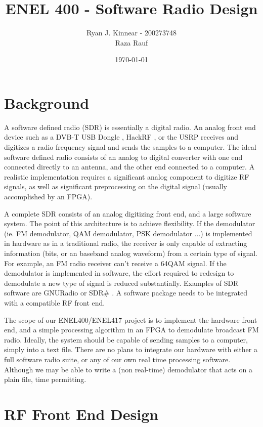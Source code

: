 \documentclass[a4paper, 12pt]{article}
\author{Ryan J. Kinnear - 200273748 \\ Raza Rauf}
\title{ENEL 400 - Software Radio Design}
\date{\today}
\begin{document}
\maketitle

\section{Background}
A software defined radio (SDR) is essentially a digital radio.  An analog front end device such as a DVB-T USB Dongle \cite{usb_dongle}, HackRF \cite{hackrf}, or the USRP \cite{usrp} receives and digitizes a radio frequency signal and sends the samples to a computer.  The ideal software defined radio consists of an analog to digital converter with one end connected directly to an antenna, and the other end connected to a computer.  A realistic implementation requires a significant analog component to digitize RF signals, as well as significant preprocessing on the digital signal (usually accomplished by an FPGA).

A complete SDR consists of an analog digitizing front end, and a large software system.  The point of this architecture is to achieve flexibility.  If the demodulator (ie. FM demodulator, QAM demodulator, PSK demodulator ...) is implemented in hardware as in a traditional radio, the receiver is only capable of extracting information (bits, or an baseband analog waveform) from a certain type of signal.  For example, an FM radio receiver can't receive a 64QAM signal.  If the demodulator is implemented in software, the effort required to redesign to demodulate a new type of signal is reduced substantially.  Examples of SDR software are GNURadio \cite{gnu_radio} or SDR\# \cite{sdr_sharp}.  A software package needs to be integrated with a compatible RF front end.

The scope of our ENEL400/ENEL417 project is to implement the hardware front end, and a simple processing algorithm in an FPGA to demodulate broadcast FM radio.  Ideally, the system should be capable of sending samples to a computer, simply into a text file.  There are no plans to integrate our hardware with either a full software radio suite, or any of our own real time processing software.  Although we may be able to write a (non real-time) demodulator that acts on a plain file, time permitting.

\section{RF Front End Design}
\end{document}
